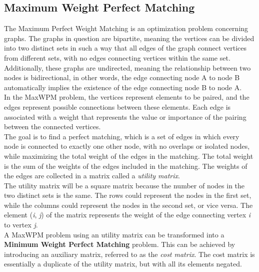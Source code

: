 \subsection{Maximum Weight Perfect Matching}
\label{sec:MaxWPM}
The Maximum Perfect Weight Matching is an optimization problem concerning graphs.
The graphs in question are bipartite, meaning the vertices can be divided into two distinct sets in such a way that all edges of the graph connect vertices from different sets, with no edges connecting vertices within the same set.
Additionally, these graphs are undirected, meaning the relationship between two nodes is bidirectional, in other words, the edge connecting node A to node B automatically implies the existence of the edge connecting node B to node A. \\
In the MaxWPM problem, the vertices represent elements to be paired, and the edges represent possible connections between these elements. 
Each edge is associated with a weight that represents the value or importance of the pairing between the connected vertices.\\
The goal is to find a perfect matching, which is a set of edges in which every node is connected to exactly one other node, with no overlaps or isolated nodes, while maximizing the total weight of the edges in the matching.
The total weight is the sum of the weights of the edges included in the matching.
The weights of the edges are collected in a matrix called a \textit{utility matrix}.\\
The utility matrix will be a square matrix because the number of nodes in the two distinct sets is the same.
The rows could represent the nodes in the first set, while the columns could represent the nodes in the second set, or vice versa.
The element (\textit{i}, \textit{j}) of the matrix represents the weight of the edge connecting vertex \textit{i} to vertex \textit{j}. \\

A MaxWPM problem using an utility matrix can be transformed into a \textbf{Minimum Weight Perfect Matching} problem.
This can be achieved by introducing an auxiliary matrix, referred to as the \textit{cost matrix}.
The cost matrix is essentially a duplicate of the utility matrix, but with all its elements negated.

